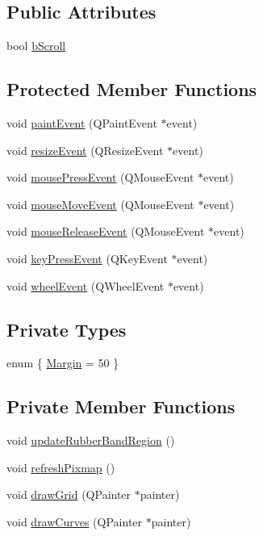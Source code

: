 \subsection*{\-Public \-Attributes}
\begin{DoxyCompactItemize}
\item 
bool \hyperlink{class_plotter_ae4a2f9fec7b69141f70bbcf548f25427}{b\-Scroll}
\end{DoxyCompactItemize}
\subsection*{\-Protected \-Member \-Functions}
\begin{DoxyCompactItemize}
\item 
void \hyperlink{class_plotter_a06477bf987646f000a8982db1352a11d}{paint\-Event} (\-Q\-Paint\-Event $\ast$event)
\item 
void \hyperlink{class_plotter_ac7f7f91ac094ca5854444d859770e967}{resize\-Event} (\-Q\-Resize\-Event $\ast$event)
\item 
void \hyperlink{class_plotter_aac8dfc9c49d06ccf085973ceec6eb50c}{mouse\-Press\-Event} (\-Q\-Mouse\-Event $\ast$event)
\item 
void \hyperlink{class_plotter_aedd6ee525b4cacb6bcbc7540ed1ef3e9}{mouse\-Move\-Event} (\-Q\-Mouse\-Event $\ast$event)
\item 
void \hyperlink{class_plotter_ab2bc4de7e7b866686beafde21cf2c872}{mouse\-Release\-Event} (\-Q\-Mouse\-Event $\ast$event)
\item 
void \hyperlink{class_plotter_a5cdbd19cee8030c80e6f2a937618ab60}{key\-Press\-Event} (\-Q\-Key\-Event $\ast$event)
\item 
void \hyperlink{class_plotter_aa7b9d248476cc83d63c41a0b903eb6fd}{wheel\-Event} (\-Q\-Wheel\-Event $\ast$event)
\end{DoxyCompactItemize}
\subsection*{\-Private \-Types}
\begin{DoxyCompactItemize}
\item 
enum \{ \hyperlink{class_plotter_a9e77c5b581af48fbcf2b876c08f1e32ca020d9897a6cebf24a7862abf26c748aa}{\-Margin} =  50
 \}
\end{DoxyCompactItemize}
\subsection*{\-Private \-Member \-Functions}
\begin{DoxyCompactItemize}
\item 
void \hyperlink{class_plotter_a9824c263d7a2eb56c69b4598a13f086b}{update\-Rubber\-Band\-Region} ()
\item 
void \hyperlink{class_plotter_af05b7b0627b2b865b7e6fce0fd74ba13}{refresh\-Pixmap} ()
\item 
void \hyperlink{class_plotter_ad29aa4be5e77624f4dec6866b5defa33}{draw\-Grid} (\-Q\-Painter $\ast$painter)
\item 
void \hyperlink{class_plotter_a0eaeed4e032bfea55093af61da5e4cfe}{draw\-Curves} (\-Q\-Painter $\ast$painter)
\end{DoxyCompactItemize}
